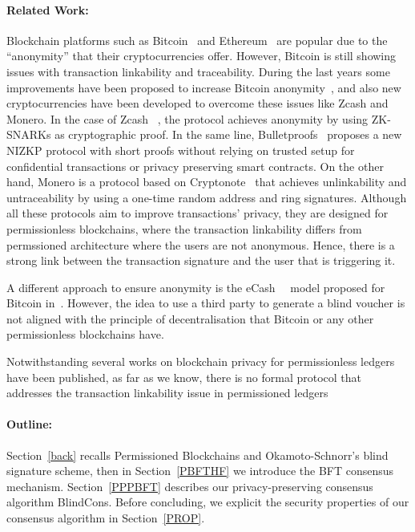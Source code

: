 \documentclass[conference]{llncs}
\newcommand{\name}{BlindCons}
\begin{document}
\paragraph*{Related Work:}
Blockchain platforms such as Bitcoin~\cite{nakamoto2008bitcoin} and Ethereum~\cite{wood2014ethereum} are popular due to the ``anonymity'' that their cryptocurrencies offer. However, Bitcoin is still showing issues with transaction linkability and traceability.  During the last years some improvements have been proposed to increase Bitcoin anonymity~\cite{saxena2014increasing}, and also new cryptocurrencies have been developed to overcome these issues like Zcash and Monero. In the case of Zcash ~\cite{hopwood2016zcash}, the protocol achieves anonymity by using ZK-SNARKs as cryptographic proof. In the same line, Bulletproofs~\cite{bunz2018bulletproofs} proposes a new NIZKP protocol with short proofs without relying on trusted setup for confidential transactions or privacy preserving smart contracts. On the other hand, Monero is a protocol based on Cryptonote~\cite{van2013cryptonote} that achieves unlinkability and untraceability by using a one-time random address and ring signatures.  Although all these protocols aim to improve transactions' privacy, they are designed for permissionless blockchains, where the transaction linkability differs from permssioned architecture where the users are not anonymous. Hence, there is a strong link between the transaction signature and the user that is triggering it.

A different approach to ensure anonymity is the eCash~\cite{chaum1983blind}~\cite{chaum1988untraceable} model proposed for Bitcoin in~\cite{heilman2016blindly}. However, the idea to use a third party to generate a blind voucher is not aligned with the principle of decentralisation that Bitcoin or any other permissionless blockchains have. 

Notwithstanding several works on blockchain privacy for permissionless ledgers have been published, as far as we know, there is no formal protocol that addresses the transaction linkability issue in permissioned ledgers

\paragraph*{Outline:}  Section~\ref{back} recalls Permissioned Blockchains and Okamoto-Schnorr's blind signature scheme, then in Section~\ref{PBFTHF} we introduce the BFT consensus mechanism. Section~\ref{PPPBFT} describes our privacy-preserving consensus algorithm \name{}. Before concluding, we explicit the security properties of our consensus algorithm in Section~\ref{PROP}.
\end{document}
